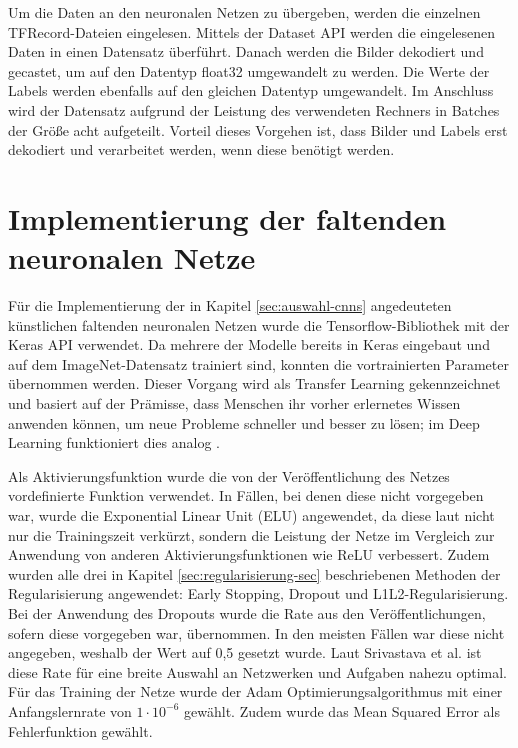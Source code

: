 \mypar Um die Daten an den neuronalen Netzen zu übergeben, werden die einzelnen TFRecord-Dateien eingelesen. Mittels der Dataset API werden die eingelesenen Daten in einen Datensatz überführt. Danach werden die Bilder dekodiert und gecastet, um auf den Datentyp float32 umgewandelt zu werden. Die Werte der Labels werden ebenfalls auf den gleichen Datentyp umgewandelt. Im Anschluss wird der Datensatz aufgrund der Leistung des verwendeten Rechners in Batches der Größe acht aufgeteilt. Vorteil dieses Vorgehen ist, dass Bilder und Labels erst dekodiert und verarbeitet werden, wenn diese benötigt werden. 


\section{Implementierung der faltenden neuronalen Netze}
Für die Implementierung der in Kapitel \ref{sec:auswahl-cnns} angedeuteten künstlichen faltenden neuronalen Netzen wurde die Tensorflow-Bibliothek mit der Keras API \cite{chollet2015keras} verwendet. Da mehrere der Modelle bereits in Keras eingebaut und auf dem ImageNet-Datensatz trainiert sind, konnten die vortrainierten Parameter übernommen werden. Dieser Vorgang wird als Transfer Learning gekennzeichnet und basiert auf der Prämisse, dass Menschen ihr vorher erlernetes Wissen anwenden können, um neue Probleme schneller und besser zu lösen; im Deep Learning funktioniert dies analog \cite{pan2009survey}.

\mypar Als Aktivierungsfunktion wurde die von der Veröffentlichung des Netzes vordefinierte Funktion verwendet. In Fällen, bei denen diese nicht vorgegeben war, wurde die Exponential Linear Unit (ELU) angewendet, da diese laut \cite{elus} nicht nur die Trainingszeit verkürzt, sondern die Leistung der Netze im Vergleich zur Anwendung von anderen Aktivierungsfunktionen wie ReLU verbessert. Zudem wurden alle drei in Kapitel \ref{sec:regularisierung-sec} beschriebenen Methoden der Regularisierung angewendet: Early Stopping, Dropout und L1L2-Regularisierung. Bei der Anwendung des Dropouts wurde die Rate aus den Veröffentlichungen, sofern diese vorgegeben war, übernommen. In den meisten Fällen war diese nicht angegeben, weshalb der Wert auf 0,5 gesetzt wurde. Laut Srivastava et al. \cite{dropout} ist diese Rate für eine breite Auswahl an Netzwerken und Aufgaben nahezu optimal. Für das Training der Netze wurde der Adam Optimierungsalgorithmus mit einer Anfangslernrate von $1 \cdot 10^{-6}$ gewählt. Zudem wurde das Mean Squared Error als Fehlerfunktion gewählt. 


